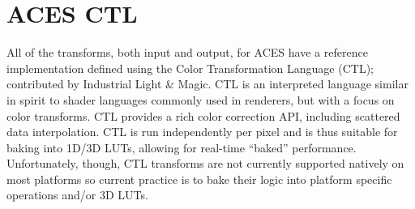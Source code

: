 \section{ACES CTL}
\label{sec:aces-ctl}

All of the transforms, both input and output, for ACES have a reference implementation defined using the Color Transformation Language (CTL); contributed by Industrial Light & Magic. CTL is an interpreted language similar in spirit to shader languages commonly used in renderers, but with a focus on color transforms. CTL provides a rich color correction API, including scattered data interpolation. CTL is run independently per pixel and is thus suitable for baking into 1D/3D LUTs, allowing for real-time “baked” performance. Unfortunately, though, CTL transforms are not currently supported natively on most platforms so current practice is to bake their logic into platform specific operations and/or 3D LUTs.

